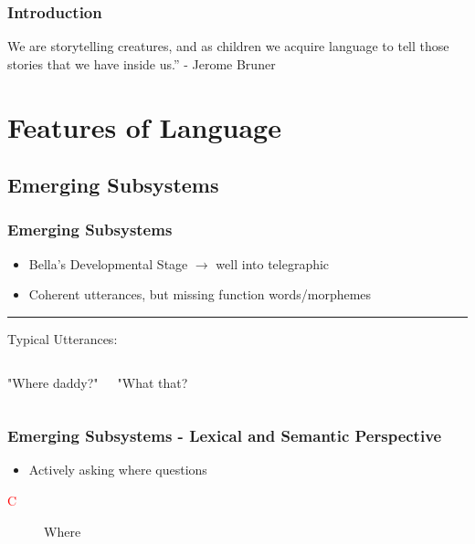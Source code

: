 \documentclass{beamer}
\begin{document}
\begin{frame}
	\frametitle{Introduction}
	
	\begin{displayquote}
		We are storytelling creatures, and as children we acquire language to tell those stories that we have inside us.” - Jerome Bruner	
	\end{displayquote}

\end{frame}

\section{Features of Language}
\subsection{Emerging Subsystems}
\begin{frame}
	\frametitle{Emerging Subsystems}
	\begin{itemize}
		\item Bella's Developmental Stage $\rightarrow$ well into telegraphic
		\item Coherent utterances, but missing function words/morphemes
	\end{itemize}
	\noindent\rule{\textwidth}{1pt}
	
	\centering
	Typical Utterances:
	\vspace{2mm}
	\begin{columns}
			\centering
			\begin{displayquote}
				"Where daddy?"
			\end{displayquote}

			\centering
			\begin{displayquote}
				"What that?
			\end{displayquote}
	\end{columns}

	
\end{frame}

\begin{frame}
	\frametitle{Emerging Subsystems - Lexical and Semantic Perspective}
	
	\begin{itemize}
		\item Actively asking where questions
	\end{itemize}
	\begin{description}
	\item[\textcolor{red}{C}] Where 
	\end{description}
\end{frame}
\end{document}
